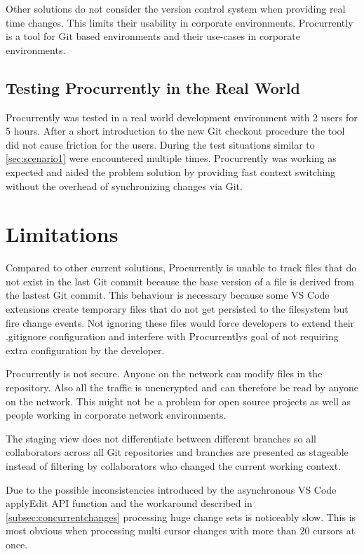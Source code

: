 Other solutions do not consider the version control system when providing real time changes. This limits their usability in corporate environments. Procurrently is a tool for Git based environments and their use-cases in corporate environments. 

\subsection{Testing Procurrently in the Real World}

Procurrently was tested in a real world development environment with 2 users for 5 hours. After a short introduction to the new Git checkout procedure the tool did not cause friction for the users. During the test situations similar to \autoref{sec:scenario1} were encountered multiple times. Procurrently was working as expected and aided the problem solution by providing fast context switching without the overhead of synchronizing changes via Git.

\section{Limitations}

Compared to other current solutions, Procurrently is unable to track files that do not exist in the last Git commit because the base version of a file is derived from the lastest Git commit. This behaviour is necessary because some VS Code extensions create temporary files that do not get persisted to the filesystem but fire change events. Not ignoring these files would force developers to extend their .gitignore configuration and interfere with Procurrentlys goal of not requiring extra configuration by the developer.

Procurrently is not secure. Anyone on the network can modify files in the repository. Also all the traffic is unencrypted and can therefore be read by anyone on the network. This might not be a problem for open source projects as well as people working in corporate network environments.

The staging view does not differentiate between different branches so all collaborators across all Git repositories and branches are presented as stageable instead of filtering by collaborators who changed the current working context.

Due to the possible inconsistencies introduced by the asynchronous VS Code applyEdit API function and the workaround described in \autoref{subsec:concurrentchanges} processing huge change sets is noticeably slow. This is most obvious when processing multi cursor changes with more than 20 cursors at once.

